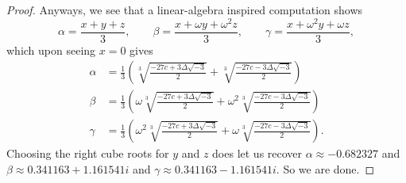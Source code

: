 \begin{proof}
	Anyways, we see that a linear-algebra inspired computation shows
	\[\alpha=\frac{x+y+z}3,\qquad\beta=\frac{x+\omega y+\omega^2z}{3},\qquad\gamma=\frac{x+\omega^2y+\omega z}{3},\]
	which upon seeing $x=0$ gives
	\begin{align*}
		\alpha &= \frac13\left(\sqrt[3]{\frac{-27c+3\Delta\sqrt{-3}}2}+\sqrt[3]{\frac{-27c-3\Delta\sqrt{-3}}2}\right) \\
		\beta &= \frac13\left(\omega\sqrt[3]{\frac{-27c+3\Delta\sqrt{-3}}2}+\omega^2\sqrt[3]{\frac{-27c-3\Delta\sqrt{-3}}2}\right) \\
		\gamma &= \frac13\left(\omega^2\sqrt[3]{\frac{-27c+3\Delta\sqrt{-3}}2}+\omega\sqrt[3]{\frac{-27c-3\Delta\sqrt{-3}}2}\right).
	\end{align*}
	Choosing the right cube roots for $y$ and $z$ does let us recover $\alpha\approx-0.682327$ and $\beta\approx0.341163+1.161541i$ and $\gamma\approx0.341163-1.161541i.$ So we are done.
\end{proof}

